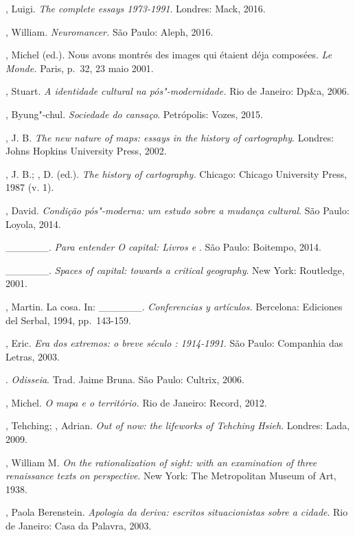 \begin{Parskip}
, Luigi. \emph{The complete essays 1973-1991}. Londres: Mack,
2016.

, William. \emph{Neuromancer.} São Paulo: Aleph, 2016.

, Michel (ed.). Nous avons montrés des images qui étaient déja
composées. \emph{Le Monde.} Paris, p.~32, 23 maio 2001.

, Stuart. \emph{A identidade cultural na pós"-modernidade.} Rio de
Janeiro: Dp\&a, 2006.

, Byung"-chul. \emph{Sociedade do cansaço}. Petrópolis: Vozes, 2015.

, J. B. \emph{The new nature of maps: essays in the history of
cartography}. Londres: Johns Hopkins University Press, 2002.

, J. B.; , D. (ed.). \emph{The history of cartography.}
Chicago: Chicago University Press, 1987 (v. 1).

, David. \emph{Condição pós"-moderna: um estudo sobre a mudança
cultural}. São Paulo: Loyola, 2014.

\_\_\_\_\_\_. \emph{Para entender \emph{O capital}: Livros  e
}. São Paulo: Boitempo, 2014.

\_\_\_\_\_\_. \emph{Spaces of capital: towards a critical
geography}. New York: Routledge, 2001.

, Martin. La cosa. In: \_\_\_\_\_\_. \emph{Conferencias y
artículos.} Bercelona: Ediciones del Serbal, 1994, pp.~143-159.

, Eric. \emph{Era dos extremos: o breve século : 1914-1991}.
São Paulo: Companhia das Letras, 2003.

. \emph{Odisseia}. Trad. Jaime Bruna. São Paulo: Cultrix, 2006.

, Michel. \emph{O mapa e o território.} Rio de Janeiro:
Record, 2012.

, Tehching; , Adrian. \emph{Out of now: the lifeworks
of Tehching Hsieh}. Londres: Lada, 2009.

, William M. \emph{On the rationalization of sight: with an
examination of three renaissance texts on perspective}. New York: The
Metropolitan Museum of Art, 1938.

, Paola Berenstein. \emph{Apologia da deriva: escritos
situacionistas sobre a cidade}. Rio de Janeiro: Casa da Palavra, 2003.


\end{Parskip}
